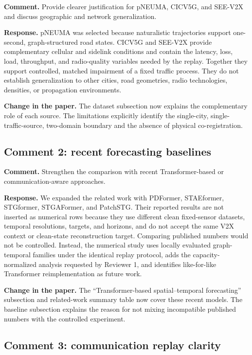 \documentclass[11pt]{article}
\newcommand{\reviewcomment}[1]{\par\textcolor{commentblue}{\textbf{Comment.} #1}\par}
\newcommand{\authorresponse}[1]{\par\textcolor{responsegreen}{\textbf{Response.} #1}\par}
\newcommand{\paperchange}[1]{\par\textbf{Change in the paper.} #1\par}
\begin{document}
\reviewcomment{Provide clearer justification for pNEUMA, CICV5G, and SEE-V2X and discuss geographic and network generalization.}

\authorresponse{pNEUMA was selected because naturalistic trajectories support one-second, graph-structured road states. CICV5G and SEE-V2X provide complementary cellular and sidelink conditions and contain the latency, loss, load, throughput, and radio-quality variables needed by the replay. Together they support controlled, matched impairment of a fixed traffic process. They do not establish generalization to other cities, road geometries, radio technologies, densities, or propagation environments.}

\paperchange{The dataset subsection now explains the complementary role of each source. The limitations explicitly identify the single-city, single-traffic-source, two-domain boundary and the absence of physical co-registration.}

\subsection*{Comment 2: recent forecasting baselines}

\reviewcomment{Strengthen the comparison with recent Transformer-based or communication-aware approaches.}

\authorresponse{We expanded the related work with PDFormer, STAEformer, STGformer, STGAFormer, and PatchSTG. Their reported results are not inserted as numerical rows because they use different clean fixed-sensor datasets, temporal resolutions, targets, and horizons, and do not accept the same V2X context or clean-state reconstruction target. Comparing published numbers would not be controlled. Instead, the numerical study uses locally evaluated graph-temporal families under the identical replay protocol, adds the capacity-normalized analysis requested by Reviewer 1, and identifies like-for-like Transformer reimplementation as future work.}

\paperchange{The ``Transformer-based spatial--temporal forecasting'' subsection and related-work summary table now cover these recent models. The baseline subsection explains the reason for not mixing incompatible published numbers with the controlled experiment.}

\subsection*{Comment 3: communication replay clarity}
\end{document}
